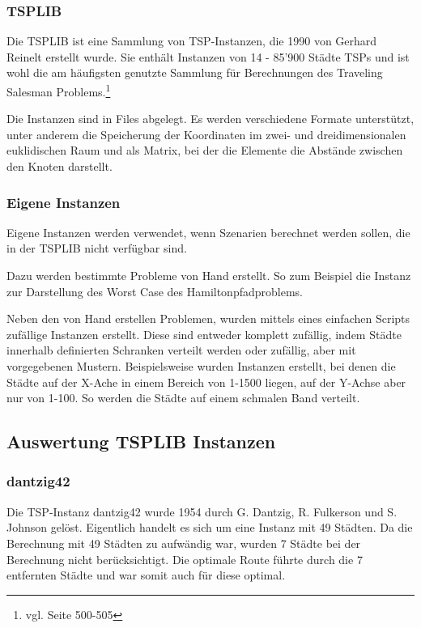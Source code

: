 \documentclass[11pt,a4paper]{article}
\begin{document}
\subsubsection{TSPLIB}
Die TSPLIB ist eine Sammlung von TSP-Instanzen, die 1990 von Gerhard Reinelt erstellt wurde. Sie enthält Instanzen von 14 - 85'900 Städte TSPs und ist wohl die am häufigsten genutzte Sammlung für Berechnungen des Traveling Salesman Problems.\footnote{vgl. \cite{applegate06} Seite 500-505}

Die Instanzen sind in Files abgelegt. Es werden verschiedene Formate unterstützt, unter anderem die Speicherung der Koordinaten im zwei- und dreidimensionalen euklidischen Raum und als Matrix, bei der die Elemente die Abstände zwischen den Knoten darstellt.

\subsubsection{Eigene Instanzen}
Eigene Instanzen werden verwendet, wenn Szenarien berechnet werden sollen, die in der TSPLIB nicht verfügbar sind.

Dazu werden bestimmte Probleme von Hand erstellt. So zum Beispiel die Instanz zur Darstellung des Worst Case des Hamiltonpfadproblems.

Neben den von Hand erstellen Problemen, wurden mittels eines einfachen Scripts zufällige Instanzen erstellt. Diese sind entweder komplett zufällig, indem Städte innerhalb definierten Schranken verteilt werden oder zufällig, aber mit vorgegebenen Mustern. Beispielsweise wurden Instanzen erstellt, bei denen die Städte auf der X-Ache in einem Bereich von 1-1500 liegen, auf der Y-Achse aber nur von 1-100. So werden die Städte auf einem schmalen Band verteilt.

\subsection{Auswertung TSPLIB Instanzen}

\subsubsection{dantzig42}
Die TSP-Instanz dantzig42 wurde 1954 durch G. Dantzig, R. Fulkerson und S. Johnson gelöst. Eigentlich handelt es sich um eine Instanz mit 49 Städten. Da die Berechnung mit 49 Städten zu aufwändig war, wurden 7 Städte bei der Berechnung nicht berücksichtigt. Die optimale Route führte durch die 7 entfernten Städte und war somit auch für diese optimal.
\end{document}
